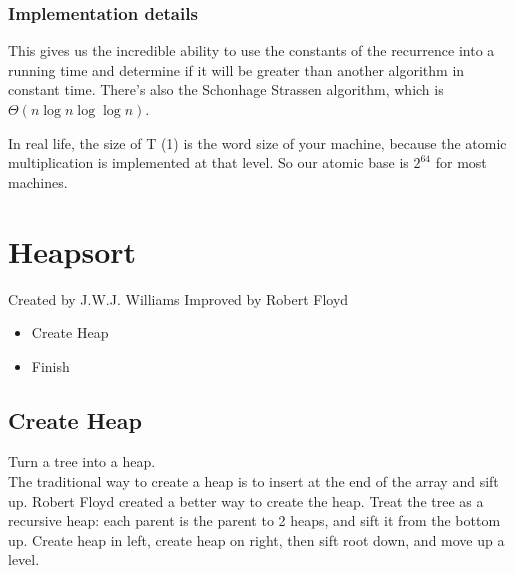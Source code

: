 \documentclass[english, 10pt]{article}
\begin{document}
\subsubsection{Implementation details}

This gives us the incredible ability to use the constants of the recurrence
into a running time and determine if it will be greater than another algorithm in
constant time.  There's also the Schonhage Strassen algorithm, which is
$\Theta(n\log n \log\log n)$.

In real life, the size of T (1) is the word size of your machine, because the
atomic multiplication is implemented at that level. So our atomic base is
$2^{64}$ for most machines.

\section{Heapsort}
Created by J.W.J. Williams
Improved by Robert Floyd

\begin{itemize}
    \item Create Heap
    \item Finish
\end{itemize}



\subsection{Create Heap}
Turn a tree into a heap.\\
The traditional way to create a heap is to insert at the end of the array and sift up.
Robert Floyd created a better way to create the heap. Treat the tree as a recursive heap:
each parent is the parent to 2 heaps, and sift it from the bottom up. Create heap in left,
create heap on right, then sift root down, and move up a level.
\end{document}

